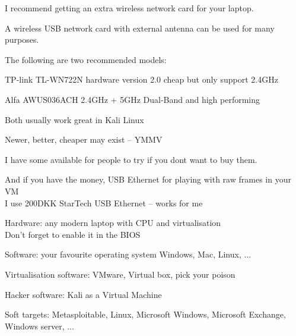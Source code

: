 \documentclass[Screen16to9,17pt]{foils}
\begin{document}

I recommend getting an extra wireless network card for your laptop.

A wireless USB network card with external antenna can be used for many purposes.

\begin{list2}
\item The following are two recommended models:
\item TP-link TL-WN722N hardware version 2.0 cheap but only support 2.4GHz
\item Alfa AWUS036ACH 2.4GHz + 5GHz Dual-Band and high performing
\item Both usually work great in Kali Linux
\item Newer, better, cheaper may exist -- YMMV
\end{list2}

I have some available for people to try if you dont want to buy them.

And if you have the money, USB Ethernet for playing with raw frames in your VM\\
I use 200DKK StarTech USB Ethernet -- works for me




\begin{list2}
\item Hardware: any modern laptop with CPU and virtualisation\\
Don't forget to enable it in the BIOS
\item Software: your favourite operating system Windows, Mac, Linux, ...
\item Virtualisation software: VMware, Virtual box, pick your poison
\item Hacker software: Kali as a Virtual Machine 
\item Soft targets: Metasploitable, Linux, Microsoft Windows, Microsoft Exchange, Windows server, ...
\end{list2}
\end{document}
